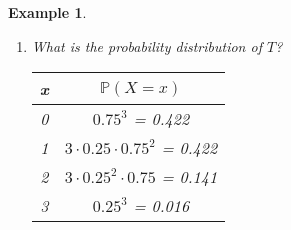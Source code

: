 \documentclass[12pt]{amsart}
\newtheorem{example}[theorem]{Example}
\begin{document}
{\begin{example}
\begin{enumerate}
\color{black}


\item What is the probability distribution of $T$?

\color{blue}
\vspace{1cm}
\begin{tabular}{| c | c |}
  \hline                       
  x & $\mathbb{P}(X=x)$  \\
   \hline     
  0 & $0.75^3$ = 0.422\\
  1 & $ 3\cdot0.25\cdot0.75^2$ = 0.422\\
  2 & $ 3\cdot0.25^2\cdot0.75$  = 0.141\\
  3 &$0.25^3$ =  0.016\\
  \hline  
\end{tabular}
\color{black}

\end{enumerate}


\end{example} 




}  %
\end{document}
